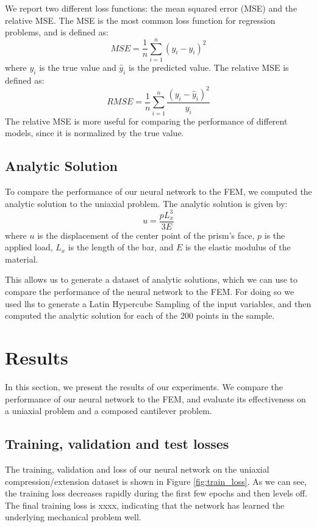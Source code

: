 \documentclass[11pt]{scrartcl} %
\begin{document}
We report two different loss functions: the mean squared error (MSE) and the relative MSE. The MSE is the most common loss function for regression problems, and is defined as:
\begin{equation}
\label{eq:MSE}
MSE = \frac{1}{n} \sum_{i=1}^{n} (y_i - \hat{y}_i)^2
\end{equation}
where $y_i$ is the true value and $\hat{y}_i$ is the predicted value. The relative MSE is defined as:
\begin{equation}
\label{eq:RMSE}
RMSE = \frac{1}{n} \sum_{i=1}^{n} \frac{(y_i - \hat{y}_i)^2}{y_i}
\end{equation}
The relative MSE is more useful for comparing the performance of different models, since it is normalized by the true value.

\subsection{Analytic Solution}
To compare the performance of our neural network to the FEM, we computed the analytic solution to the uniaxial problem. The analytic solution is given by:
\begin{equation}
\label{eq:analytic_solution}
u = \frac{pL_x^3}{3E}
\end{equation}
where $u$ is the displacement of the center point of the prism's face, $p$ is the applied load, $L_x$ is the length of the bar, and $E$ is the elastic modulus of the material.

This allows us to generate a dataset of analytic solutions, which we can use to compare the performance of the neural network to the FEM. For doing so we used lhs to generate a Latin Hypercube Sampling of the input variables, and then computed the analytic solution for each of the 200 points in the sample.


\section{Results}
In this section, we present the results of our experiments. We compare the performance of our neural network to the FEM, and evaluate its effectiveness on a uniaxial problem and a composed cantilever problem.

\subsection{Training, validation and test losses}
The training, validation and  loss of our neural network on the uniaxial compression/extension dataset is shown in Figure \ref{fig:train_loss}. As we can see, the training loss decreases rapidly during the first few epochs and then levels off. The final training loss is xxxx, indicating that the network has learned the underlying mechanical problem well.
\end{document}
